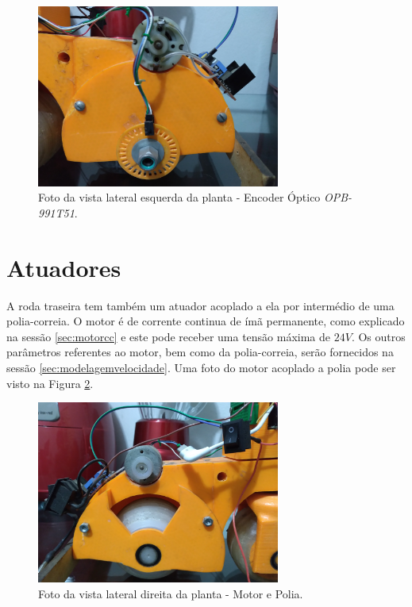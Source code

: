     	\begin{figure}[h]
            \centering
            \includegraphics[width=8cm]{Imagens/cap2/foto-encoder.jpg}
            \caption{Foto da vista lateral esquerda da planta - Encoder Óptico \textit{OPB-991T51}.}
            \label{img:encoder}
        \end{figure}
    
    \section{Atuadores}
    
	    A roda traseira tem também um atuador acoplado a ela por intermédio de uma polia-correia. O motor é de corrente continua de ímã permanente, como explicado na sessão \ref{sec:motorcc} e este pode receber uma tensão máxima de $24V$. Os outros parâmetros referentes ao motor, bem como da polia-correia, serão fornecidos na sessão \ref{sec:modelagemvelocidade}. Uma foto do motor acoplado a polia pode ser visto na Figura \ref{img:motor-polia}.
	
    	\begin{figure}[h]
            \centering
            \includegraphics[width=8cm]{Imagens/cap2/foto-motor-polia.jpg}
            \caption{Foto da vista lateral direita da planta - Motor e Polia.}
            \label{img:motor-polia}
        \end{figure}
	    
